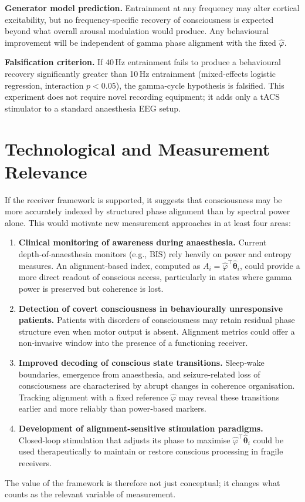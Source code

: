 \documentclass[12pt]{article}
\begin{document}
\textbf{Generator model prediction.} Entrainment at any frequency may alter cortical excitability, but no frequency‑specific recovery of consciousness is expected beyond what overall arousal modulation would produce. Any behavioural improvement will be independent of gamma phase alignment with the fixed $\hat{\varphi}$.

\textbf{Falsification criterion.} If 40\,Hz entrainment fails to produce a behavioural recovery significantly greater than 10\,Hz entrainment (mixed‑effects logistic regression, interaction $p < 0.05$), the gamma‑cycle hypothesis is falsified. This experiment does not require novel recording equipment; it adds only a tACS stimulator to a standard anaesthesia EEG setup.

\section{Technological and Measurement Relevance}

If the receiver framework is supported, it suggests that consciousness may be more accurately indexed by structured phase alignment than by spectral power alone. This would motivate new measurement approaches in at least four areas:
\begin{enumerate}
    \item \textbf{Clinical monitoring of awareness during anaesthesia.} Current depth‑of‑anaesthesia monitors (e.g., BIS) rely heavily on power and entropy measures. An alignment‑based index, computed as $A_i = \hat{\varphi}^\top \hat{\boldsymbol{\theta}}_i$, could provide a more direct readout of conscious access, particularly in states where gamma power is preserved but coherence is lost.
    \item \textbf{Detection of covert consciousness in behaviourally unresponsive patients.} Patients with disorders of consciousness may retain residual phase structure even when motor output is absent. Alignment metrics could offer a non‑invasive window into the presence of a functioning receiver.
    \item \textbf{Improved decoding of conscious state transitions.} Sleep‑wake boundaries, emergence from anaesthesia, and seizure‑related loss of consciousness are characterised by abrupt changes in coherence organisation. Tracking alignment with a fixed reference $\hat{\varphi}$ may reveal these transitions earlier and more reliably than power‑based markers.
    \item \textbf{Development of alignment‑sensitive stimulation paradigms.} Closed‑loop stimulation that adjusts its phase to maximise $\hat{\varphi}^\top \hat{\boldsymbol{\theta}}_i$ could be used therapeutically to maintain or restore conscious processing in fragile receivers.
\end{enumerate}
The value of the framework is therefore not just conceptual; it changes what counts as the relevant variable of measurement.
\end{document}
